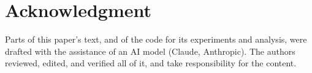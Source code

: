 \section*{Acknowledgment}
Parts of this paper's text, and of the code for its experiments and analysis,
were drafted with the assistance of an AI model (Claude, Anthropic). The authors
reviewed, edited, and verified all of it, and take responsibility for the
content.



